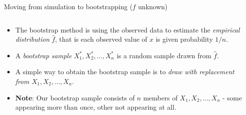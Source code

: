 \documentclass[10pt,ignorenonframetext,]{beamer}
\providecommand{\tightlist}{%
  \setlength{\itemsep}{0pt}\setlength{\parskip}{0pt}}
\begin{document}
\begin{frame}

\begin{block}{Moving from simulation to bootstrapping (\(f\) unknown)}

\(~\)

\begin{itemize}
\tightlist
\item
  The bootstrap method is using the observed data to estimate the
  \emph{empirical distribution} \(\hat{f}\), that is each observed value
  of \(x\) is given probability \(1/n\).
\end{itemize}

\vspace{2mm}

\begin{itemize}
\tightlist
\item
  A \emph{bootstrap sample} \(X^*_1,X^*_2,\ldots, X^*_n\) is a random
  sample drawn from \(\hat{f}\).
\end{itemize}

\vspace{2mm}

\begin{itemize}
\tightlist
\item
  A simple way to obtain the bootstrap sample is to \emph{draw with
  replacement from \(X_1, X_2, \ldots, X_n\)}.
\end{itemize}

\vspace{2mm}

\begin{itemize}
\tightlist
\item
  \textbf{Note}: Our bootstrap sample consists of \(n\) members of
  \(X_1, X_2, \ldots, X_n\) - some appearing more than once, other not
  appearing at all.
\end{itemize}

\end{block}

\end{frame}
\end{document}
